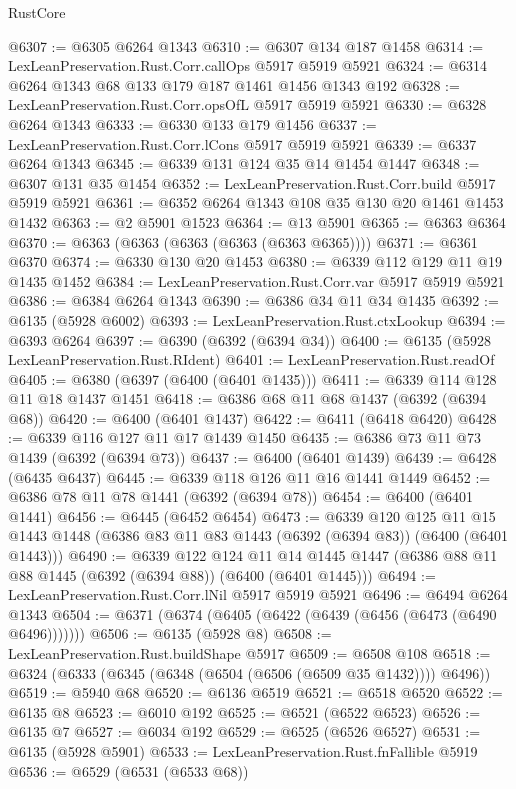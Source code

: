 \begin{lexlean}{RustCore}
\begin{coremodule}
@6307 := @6305 @6264 @1343
@6310 := @6307 @134 @187 @1458
@6314 := LexLeanPreservation.Rust.Corr.callOps @5917 @5919 @5921
@6324 := @6314 @6264 @1343 @68 @133 @179 @187 @1461 @1456 @1343 @192
@6328 := LexLeanPreservation.Rust.Corr.opsOfL @5917 @5919 @5921
@6330 := @6328 @6264 @1343
@6333 := @6330 @133 @179 @1456
@6337 := LexLeanPreservation.Rust.Corr.lCons @5917 @5919 @5921
@6339 := @6337 @6264 @1343
@6345 := @6339 @131 @124 @35 @14 @1454 @1447
@6348 := @6307 @131 @35 @1454
@6352 := LexLeanPreservation.Rust.Corr.build @5917 @5919 @5921
@6361 := @6352 @6264 @1343 @108 @35 @130 @20 @1461 @1453 @1432
@6363 := @2 @5901 @1523
@6364 := @13 @5901
@6365 := @6363 @6364
@6370 := @6363 (@6363 (@6363 (@6363 (@6363 @6365))))
@6371 := @6361 @6370
@6374 := @6330 @130 @20 @1453
@6380 := @6339 @112 @129 @11 @19 @1435 @1452
@6384 := LexLeanPreservation.Rust.Corr.var @5917 @5919 @5921
@6386 := @6384 @6264 @1343
@6390 := @6386 @34 @11 @34 @1435
@6392 := @6135 (@5928 @6002)
@6393 := LexLeanPreservation.Rust.ctxLookup
@6394 := @6393 @6264
@6397 := @6390 (@6392 (@6394 @34))
@6400 := @6135 (@5928 LexLeanPreservation.Rust.RIdent)
@6401 := LexLeanPreservation.Rust.readOf
@6405 := @6380 (@6397 (@6400 (@6401 @1435)))
@6411 := @6339 @114 @128 @11 @18 @1437 @1451
@6418 := @6386 @68 @11 @68 @1437 (@6392 (@6394 @68))
@6420 := @6400 (@6401 @1437)
@6422 := @6411 (@6418 @6420)
@6428 := @6339 @116 @127 @11 @17 @1439 @1450
@6435 := @6386 @73 @11 @73 @1439 (@6392 (@6394 @73))
@6437 := @6400 (@6401 @1439)
@6439 := @6428 (@6435 @6437)
@6445 := @6339 @118 @126 @11 @16 @1441 @1449
@6452 := @6386 @78 @11 @78 @1441 (@6392 (@6394 @78))
@6454 := @6400 (@6401 @1441)
@6456 := @6445 (@6452 @6454)
@6473 := @6339
    @120
    @125
    @11
    @15
    @1443
    @1448
    (@6386 @83 @11 @83 @1443 (@6392 (@6394 @83)) (@6400 (@6401 @1443)))
@6490 := @6339
    @122
    @124
    @11
    @14
    @1445
    @1447
    (@6386 @88 @11 @88 @1445 (@6392 (@6394 @88)) (@6400 (@6401 @1445)))
@6494 := LexLeanPreservation.Rust.Corr.lNil @5917 @5919 @5921
@6496 := @6494 @6264 @1343
@6504 := @6371 (@6374 (@6405 (@6422 (@6439 (@6456 (@6473 (@6490 @6496)))))))
@6506 := @6135 (@5928 @8)
@6508 := LexLeanPreservation.Rust.buildShape @5917
@6509 := @6508 @108
@6518 := @6324 (@6333 (@6345 (@6348 (@6504 (@6506 (@6509 @35 @1432)))) @6496))
@6519 := @5940 @68
@6520 := @6136 @6519
@6521 := @6518 @6520
@6522 := @6135 @8
@6523 := @6010 @192
@6525 := @6521 (@6522 @6523)
@6526 := @6135 @7
@6527 := @6034 @192
@6529 := @6525 (@6526 @6527)
@6531 := @6135 (@5928 @5901)
@6533 := LexLeanPreservation.Rust.fnFallible @5919
@6536 := @6529 (@6531 (@6533 @68))

\end{coremodule}
\end{lexlean}

